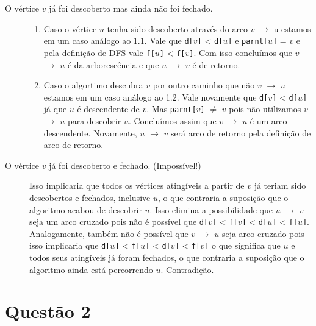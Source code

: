 \documentclass[12pt, a4paper, oneside]{article}
\begin{document}
\begin{description}
  \item [O vértice $v$ já foi descoberto mas ainda não foi fechado.] \hfill
	\begin{enumerate}
	  \item Caso o vértice
$u$ tenha sido descoberto através do arco $v$ $\rightarrow$ u estamos em um caso análogo ao
1.1. Vale que \texttt{d[$v$]} < \texttt{d[$u$]} e \texttt{parnt[$u$]} = $v$ e pela definição de DFS vale \texttt{f[$u$]} <
\texttt{f[$v$]}. Com isso concluímos que $v$ $\rightarrow$ $u$ é da arborescência e que $u$ $\rightarrow$ $v$ é de
retorno.
	  \item Caso o algortimo descubra $v$ por outro caminho que não $v$ $\rightarrow$ $u$
estamos em um caso análogo ao 1.2. Vale novamente que \texttt{d[$v$]} < \texttt{d[$u$]} já que $u$ é
descendente de $v$. Mas \texttt{parnt[$v$]} $\ne$ $v$ pois não utilizamos $v$
$\rightarrow$ $u$ para descobrir $u$. Concluímos assim que $v$ $\rightarrow$ $u$ é um arco
descendente. Novamente, $u$ $\rightarrow$ $v$ será arco de retorno pela definição de arco de retorno.
	\end{enumerate}
\end{description}

\begin{description}
  \item [O vértice $v$ já foi descoberto e fechado. (Impossível!)] \hfill
  
  Isso implicaria que todos os vértices atingíveis a partir de $v$ já teriam sido
  descobertos e fechados, inclusive $u$, o que contraria a suposição que o
  algoritmo acabou de descobrir $u$. Isso elimina a possibilidade que $u$
  $\rightarrow$ $v$ seja um arco cruzado pois não é possível que \texttt{d[$v$]} <
  \texttt{f[$v$]} < \texttt{d[$u$]} < \texttt{f[$u$]}. Analogamente, também não é
  possível que $v$ $\rightarrow$ $u$ seja arco cruzado pois isso implicaria que
  \texttt{d[$u$]} < \texttt{f[$u$]} < \texttt{d[$v$]} < \texttt{f[$v$]} o que significa
  que $u$ e todos seus atingíveis já foram fechados, o que contraria a suposição
  que o algoritmo ainda está percorrendo $u$. Contradição.
\end{description}

\section*{Questão 2}
\end{document}
